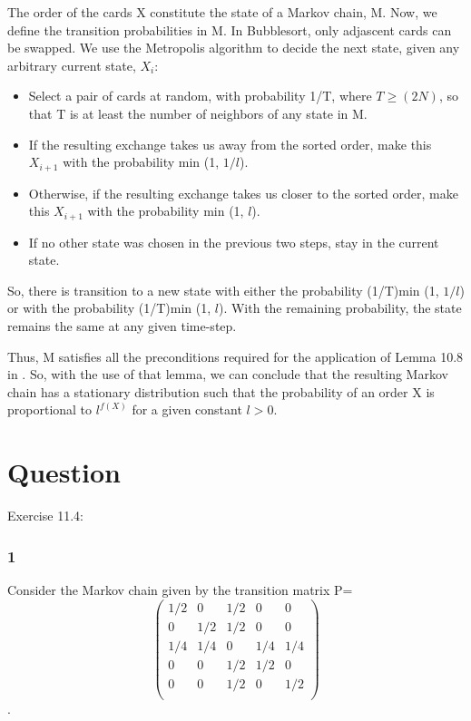 \documentclass[10pt]{amsart}
\theoremstyle{remark}
\begin{document}
The order of the cards X constitute the state of a Markov chain, M. Now, we define the transition probabilities in M. In Bubblesort, only adjascent cards can be swapped. We use the Metropolis algorithm to decide the next state, given any arbitrary current state, $X_{i}$:

\begin{itemize}
\item Select a pair of cards at random, with probability 1/T, where $T \geq (2N)$, so that T is at least the number of neighbors of any state in M.
\item If the resulting exchange takes us away from the sorted order, make this $X_{i+1}$ with the probability min (1, $1/l$).
\item Otherwise, if the resulting exchange takes us closer to the sorted order, make this $X_{i+1}$ with the probability min (1, $l$).
\item If no other state was chosen in the previous two steps, stay in the current state.
\end{itemize}

So, there is transition to a new state with either the probability (1/T)min (1, $1/l$) or with the probability (1/T)min (1, $l$). With the remaining probability, the state remains the same at any given time-step.

Thus, M satisfies all the preconditions required for the application of Lemma 10.8 in \cite{mitzenmacherUpfal}. So, with the use of that lemma, we can conclude that the resulting Markov chain has a stationary distribution such that the probability of an order X is proportional to $l^{f(X)}$ for a given constant $l>0$.

\section{Question}
Exercise 11.4:

\subsubsection{1} Consider the Markov chain given by the transition matrix
P=\[ \left( \begin{array}{ccccc}
1/2 & 0 & 1/2 & 0 & 0 \\
0 & 1/2 & 1/2 & 0 & 0 \\
1/4 & 1/4 & 0 & 1/4 & 1/4 \\
0 & 0 & 1/2 & 1/2 & 0 \\
0 & 0 & 1/2 & 0 & 1/2 \\
\end{array} \right)\].
\end{document}
